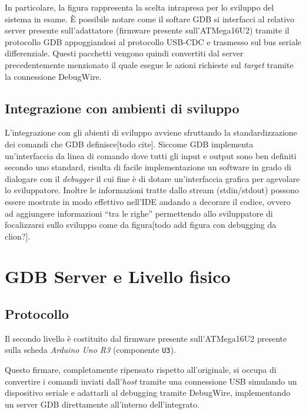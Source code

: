 In particolare, la figura rappresenta la scelta intrapresa per lo sviluppo del sistema in esame. È possibile notare come il softare GDB si interfacci al relativo server presente sull'adattatore (firmware presente sull'ATMega16U2) tramite il protocollo GDB appoggiandosi al protocollo USB-CDC e trasmesso sul bus seriale differenziale.
Questi pacchetti vengono quindi convertiti dal server precedentemente menzionato il quale esegue le azioni richieste sul \textit{target} tramite la connessione DebugWire.

\subsection{Integrazione con ambienti di sviluppo}

L'integrazione con gli abienti di sviluppo avviene sfruttando la standardizzazione dei comandi che GDB definisce[todo cite]. Siccome GDB implementa un'interfaccia da linea di comando dove tutti gli input e output sono ben definiti secondo uno standard, risulta di facile implementazione un software in grado di dialogare con il \textit{debugger} il cui fine è di dotare un'interfaccia grafica per agevolare lo sviluppatore. Inoltre le informazioni tratte dallo stream (stdin/stdout) possono essere mostrate in modo effettivo nell'IDE andando a decorare il codice, ovvero ad aggiungere informazioni ``tra le righe'' permettendo allo sviluppatore di focalizzarsi sullo sviluppo come da figura[todo add figura con debugging da clion?].

\section{GDB Server e Livello fisico}

\subsection{Protocollo}

Il secondo livello è costituito dal firmware presente sull'ATMega16U2 presente sulla scheda \textit{Arduino Uno R3} (componente \texttt{U3}).

Questo firmare, completamente ripensato rispetto all'originale, si occupa di convertire i comandi inviati dall'\textit{host} tramite una connessione USB simulando un dispositivo seriale e adattarli al debugging tramite DebugWire, implementando un server GDB direttamente all'interno dell'integrato.

